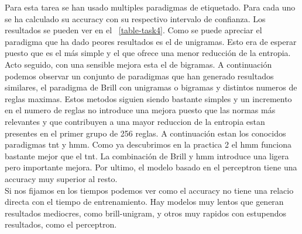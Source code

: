 \documentclass[11pt,a4paper]{report}
\begin{document}
    Para esta tarea se han usado multiples paradigmas de etiquetado. Para cada uno se ha calculado su accuracy con su respectivo intervalo de confianza. Los resultados se pueden ver en el \tablename~\ref{table-task4}. Como se puede apreciar el paradigma que ha dado peores resultados es el de unigramas. Esto era de esperar puesto que es el más simple y el que ofrece una menor reducción de la entropia. Acto seguido, con una sensible mejora esta el de bigramas. A continuación podemos observar un conjunto de paradigmas que han generado resultados similares, el paradigma de Brill con unigramas o bigramas y distintos numeros de reglas maximas. Estos metodos siguien siendo bastante simples y un incremento en el numero de reglas no introduce una mejora puesto que las normas más relevantes y que contribuyen a una mayor reduccion de la entropia estan presentes en el primer grupo de 256 reglas. A continuación estan los conocidos paradigmas tnt y hmm. Como ya descubrimos en la practica 2 el hmm funciona bastante mejor que el tnt. La combinación de Brill y hmm introduce una ligera pero importante mejora. Por ultimo, el modelo basado en el perceptron tiene una accuracy muy superior al resto.\\
    
    Si nos fijamos en los tiempos podemos ver como el accuracy no tiene una relacio directa con el tiempo de entrenamiento. Hay modelos muy lentos que generan resultados mediocres, como brill-unigram, y otros muy rapidos con estupendos resultados, como el perceptron. 
\end{document}
